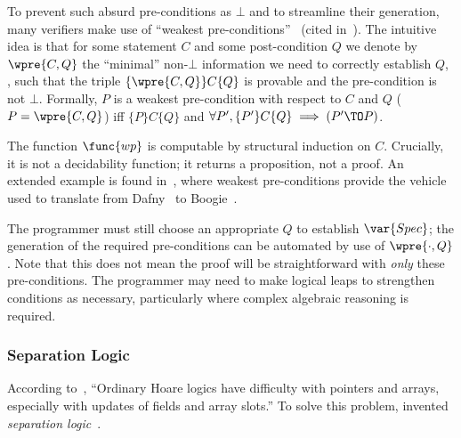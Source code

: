 To prevent such absurd pre-conditions as \(\bot\) and to streamline their
generation, many verifiers make use of ``weakest
pre-conditions''~\cite{dijkstra1976discipline,Nelson_1989} (cited
in~\cite{leino2008specification}). The intuitive idea is that for some statement
\(C\) and some post-condition \(Q\) we denote by \(\wpre{C, Q}\) the ``minimal''
non-\(\bot\) information we need to correctly establish \(Q\), \ie, such that
the triple \(\{\wpre{C,Q}\} C \{Q\}\) is provable and the pre-condition is not
\(\bot\). Formally, \(P\) is a weakest pre-condition with respect to \(C\) and
\(Q\) (\(P = \wpre{C,Q}\)) iff \(\{P\} C \{Q\}\) and \(\forall P', \{P'\} C
\{Q\} \implies (P' \TO P)\).

The function \(\func{wp}\) is computable by structural induction on
\(C\). Crucially, it is not a decidability function; it returns a proposition,
not a proof. An extended example is found in~\cite[\S 3]{leino2008specification},
where weakest pre-conditions provide the vehicle used to translate from
Dafny~\cite{leino2010dafny} to Boogie~\cite{Barnett_2006,leino2008this}.

The programmer must still choose an appropriate \(Q\) to establish
\(\var{Spec}\); the generation of the required pre-conditions can be automated
by use of \(\wpre{\cdot,Q}\). Note that this does not mean the proof will be
straightforward with \emph{only} these pre-conditions. The programmer may need
to make logical leaps to strengthen conditions as necessary, particularly where
complex algebraic reasoning is required.

\subsubsection{Separation Logic}

According to~\cite[\S 5]{Appel_2011}, ``Ordinary Hoare logics have difficulty
with pointers and arrays, especially with updates of fields and array slots.''
To solve this problem, \citeauthor{Reynolds} invented \emph{separation
logic}~\cite{Reynolds}.

